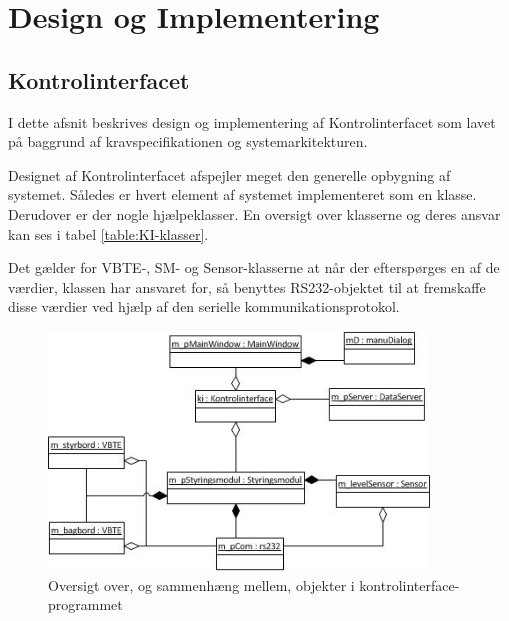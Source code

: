 \section{Design og Implementering}

\subsection{Kontrolinterfacet}
I dette afsnit beskrives design og implementering af Kontrolinterfacet som lavet på baggrund af kravspecifikationen og systemarkitekturen. 

Designet af Kontrolinterfacet afspejler meget den generelle opbygning af systemet. Således er hvert element af systemet implementeret som en klasse. Derudover er der nogle hjælpeklasser. En oversigt over klasserne og deres ansvar kan ses i tabel \ref{table:KI-klasser}.

Det gælder for VBTE-, SM- og Sensor-klasserne at når der efterspørges en af de værdier, klassen har ansvaret for, så benyttes RS232-objektet til at fremskaffe disse værdier ved hjælp af den serielle kommunikationsprotokol.


\begin{figure}[H]
\centering
\includegraphics[width = 0.9\textwidth]{billeder/Objektdiagram}
\caption{Oversigt over, og sammenhæng mellem, objekter i kontrolinterface-programmet}
\label{fig:objektdiagram}
\end{figure}


